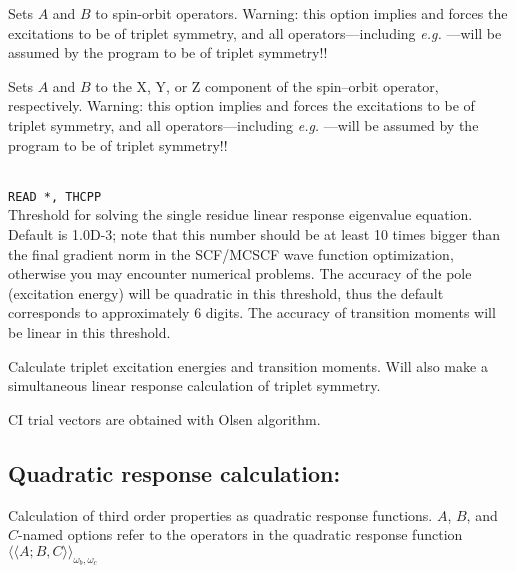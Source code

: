 \begin{description}
\item{}
Sets $A$ and $B$ to spin-orbit operators.
Warning: this option implies  and
forces the excitations to be of triplet symmetry,
and all operators---including
{\it e.g.\/} ---will be assumed by the program to be of triplet symmetry!!

\item{}
Sets $A$ and $B$ to the X, Y, or Z component of the spin--orbit
operator, respectively.
Warning: this option implies  and
forces the excitations to be of triplet symmetry,
and all operators---including
{\it e.g.\/} ---will be assumed by the program to be of triplet symmetry!!

\item{}\\
\verb|READ *, THCPP|\\
Threshold for solving the single residue linear response eigenvalue equation. 
Default is 1.0D-3; note that this number should be at least 10 times
bigger than the final gradient norm in the SCF/MCSCF
wave function optimization, otherwise you may encounter
numerical problems.
The accuracy of the pole (excitation energy) will be 
quadratic in this threshold, thus the default corresponds to approximately
6 digits. The accuracy of transition moments will be linear in this threshold.

\item{} Calculate triplet excitation energies and transition moments.
Will also make a simultaneous linear response calculation of triplet symmetry.

\item{}
CI trial vectors are obtained with Olsen algorithm.

\end{description}

\subsection{Quadratic response calculation: }

Calculation of third order properties
 as quadratic response
functions.
$A$, $B$, and $C$-named options refer to the operators in the quadratic
response function 
$\langle\!\langle A;B,C \rangle\!\rangle_{\omega_b,\omega_c}$
\cite{ovhapjhjajthjojcp97,hhhjajpjjojcp97,haovhkpjthjcp98}

